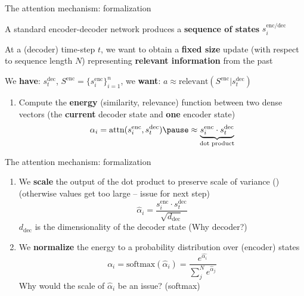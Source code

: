 \documentclass[12pt,aspectratio=169,handout]{beamer}
\newcounter{saveenumi}
\newcommand{\seti}{\setcounter{saveenumi}{\value{enumi}}}
\newcommand{\conti}{\setcounter{enumi}{\value{saveenumi}}}
\begin{document}
\begin{frame}{The attention mechanism: formalization}

A standard encoder-decoder network produces a \textbf{sequence of states} $s_{i}^{\text{enc/dec}}$
\pause

At a (decoder) time-step $t$, we want to obtain a \textbf{fixed size} update (with respect to sequence length $N$) representing \textbf{relevant information} from the past
\pause

\vspace{1em}
We \textbf{have}: $s^{\text{dec}}_t$, $S^{\text{enc}} = \{s_i^{\text{enc}}\}_{i=1}^n$, we \textbf{want}: $a \approx \text{relevant}(S^{\text{enc}}|s^{\text{dec}}_t)$

\pause
\vspace{1em}
\begin{enumerate}
	\item Compute the \textbf{energy} (similarity, relevance) function between two dense vectors (the \textbf{current} decoder state and \textbf{one} encoder state)
	$$
		\alpha_i = \text{attn}(s_i^{\text{enc}}, s_t^{\text{dec}}) \pause \approx \underbrace{s_i^{\text{enc}} \cdot s_t^{\text{dec}}}_{\text{dot product}}
	$$
	\seti
\end{enumerate}

\end{frame}

\begin{frame}{The attention mechanism: formalization}
	
	\begin{enumerate}
		\conti
		\item We \textbf{scale} the output of the dot product to preserve scale of variance (\cite{Vaswani.et.al.2017}) (otherwise values get too large -- issue for next step)
			$$
				\hat{\alpha}_i = \frac{s_i^{\text{enc}} \cdot s_t^{\text{dec}}}{\sqrt{d_{\text{dec} } } }
			$$
			\pause
			$d_{\text{dec}}$ is the dimensionality of the decoder state (Why decoder?)
			\pause
		\item We \textbf{normalize} the energy to a probability distribution over (encoder) states
		$$
			\alpha_i = \text{softmax}(\hat{\alpha}_i) = \frac{e^{\hat{\alpha_i}}}{\sum_j^N e^{\hat{\alpha}_j}}
		$$
		\seti
		\pause
		Why would the scale of $\hat{\alpha}_i$ be an issue? \pause (softmax)

	\end{enumerate}

\end{frame}
\end{document}
